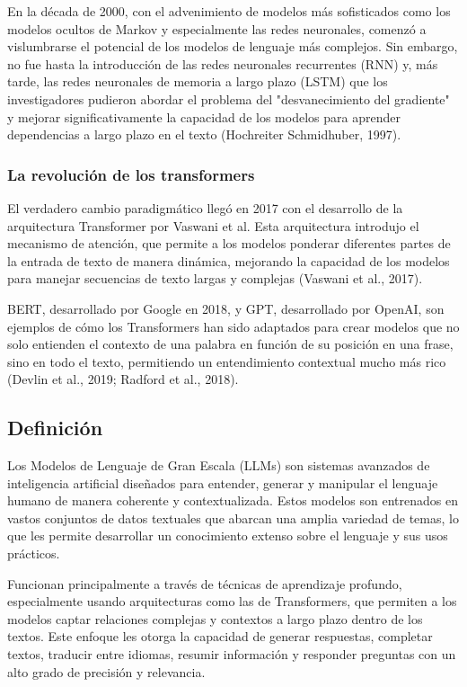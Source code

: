 En la década de 2000, con el advenimiento de modelos más sofisticados como los modelos ocultos de Markov
y especialmente las redes neuronales, comenzó a vislumbrarse el
potencial de los modelos de lenguaje más complejos. Sin embargo, no fue hasta la introducción de las redes neuronales
recurrentes (RNN) y, más tarde, las redes neuronales de memoria a largo plazo (LSTM)
que los investigadores pudieron abordar el problema del "desvanecimiento
del gradiente" y mejorar significativamente la capacidad de los
modelos para aprender dependencias a largo plazo en el texto (Hochreiter Schmidhuber, 1997).

\subsubsection*{La revolución de los transformers}
El verdadero cambio paradigmático llegó en 2017 con el desarrollo de la arquitectura
Transformer por Vaswani et al. Esta arquitectura introdujo el mecanismo
de atención, que permite a los modelos ponderar diferentes partes de la entrada de texto de manera dinámica,
mejorando la capacidad de los modelos para manejar secuencias de texto largas y complejas (Vaswani et al., 2017).


BERT, desarrollado por Google en 2018, y GPT, desarrollado por OpenAI, son ejemplos de
cómo los Transformers han sido adaptados para crear modelos que
no solo entienden el contexto de una palabra en función de su posición en una frase, sino en todo
el texto, permitiendo un entendimiento contextual mucho más rico (Devlin et al., 2019; Radford et al., 2018).

\subsection*{Definición}
Los Modelos de Lenguaje de Gran Escala (LLMs) son sistemas
avanzados de inteligencia artificial diseñados para entender, generar y
manipular el lenguaje humano de manera coherente y contextualizada. Estos
modelos son entrenados en vastos conjuntos de datos textuales que abarcan una amplia variedad de temas, lo que les
permite desarrollar un conocimiento extenso sobre el lenguaje y sus usos prácticos.

Funcionan principalmente a través de técnicas de aprendizaje
profundo, especialmente usando arquitecturas como las de Transformers,
que permiten a los modelos captar relaciones complejas y contextos a largo plazo dentro de los textos. Este enfoque les
otorga la capacidad de generar respuestas, completar textos,
traducir entre idiomas, resumir información y responder preguntas con un alto grado de precisión y relevancia.

